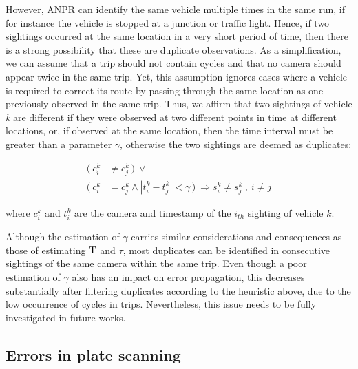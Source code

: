 However, ANPR can identify the same vehicle multiple times in the same run, if for instance the vehicle is stopped at a junction or traffic light. Hence, if two sightings occurred at the same location in a very short period of time, then there is a strong possibility that these are duplicate observations. As a simplification, we can assume that a trip should not contain cycles and that no camera should appear twice in the same trip. Yet, this assumption ignores cases where a vehicle is required to correct its route by passing through the same location as one previously observed in the same trip. Thus, we affirm that two sightings of vehicle \emph{k} are different if they were observed at two different points in time at different locations, or, if observed at the same location, then the time interval must be greater than a parameter $\gamma$, otherwise the two sightings are deemed as duplicates:


\begin{align} \label{e.sighting.different.2}
 (\ c^{k}_{i} &\ne c^{k}_{j} \, )\ \vee \\
 (\ c^{k}_{i} &= c^{k}_{j} \wedge |t^{k}_{i} - t^{k}_{j}| < \gamma \, )\ \Rightarrow s^{k}_{i} \ne s^{k}_{j}  \ , \ i \ne j \nonumber
\end{align}

where $c_i^k$ and $t_i^k$ are the camera and timestamp of the $i_{th}$ sighting of vehicle $k$.

 Although the estimation of $\gamma$ carries similar considerations and consequences as those of estimating $\mathrm{T}$ and $\tau$, most duplicates can be identified in consecutive sightings of the same camera within the same trip. Even though a poor estimation of $\gamma$ also has an impact on error propagation, this decreases substantially after filtering duplicates according to the heuristic above, due to the low occurrence of cycles in trips. Nevertheless, this issue needs to be fully investigated in future works.

\subsection{Errors in plate scanning}

